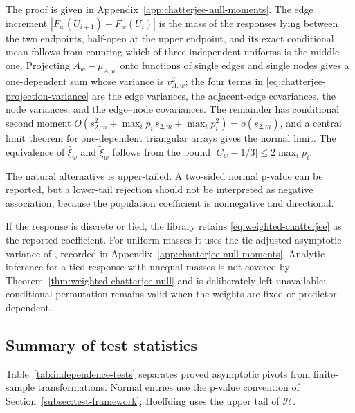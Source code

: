 The proof is given in Appendix~\ref{app:chatterjee-null-moments}. The edge
increment $|F_w(U_{i+1})-F_w(U_i)|$ is the mass of the responses lying
between the two endpoints, half-open at the upper endpoint, and its exact
conditional mean follows from counting which of three independent uniforms is
the middle one. Projecting $A_w-\mu_{A,w}$ onto functions of single edges and
single nodes gives a one-dependent sum whose variance is $v_{A,w}^2$; the four
terms in \eqref{eq:chatterjee-projection-variance} are the edge variances,
the adjacent-edge covariances, the node variances, and the edge--node
covariances. The remainder has conditional second moment
$O(s_{2,m}^2+\max_ip_i\,s_{2,m}+\max_ip_i^2)=o(s_{2,m})$, and a central limit
theorem for one-dependent triangular arrays \citep{janson2021} gives the
normal limit. The equivalence of $\widehat\xi_w$ and $\widetilde\xi_w$
follows from the bound $|C_w-1/3|\leq2\max_ip_i$.

The natural alternative is upper-tailed. A two-sided normal p-value can be
reported, but a lower-tail rejection should not be interpreted as negative
association, because the population coefficient is nonnegative and
directional.

If the response is discrete or tied, the library retains
\eqref{eq:weighted-chatterjee} as the reported coefficient. For uniform
masses it uses the tie-adjusted asymptotic variance of \citet{chatterjee2021},
recorded in Appendix~\ref{app:chatterjee-null-moments}. Analytic inference
for a tied response with unequal masses is not covered by
Theorem~\ref{thm:weighted-chatterjee-null} and is deliberately left
unavailable; conditional permutation remains valid when the weights are fixed
or predictor-dependent.

\subsection{Summary of test statistics}

Table~\ref{tab:independence-tests} separates proved asymptotic pivots from
finite-sample transformations. Normal entries use the p-value convention of
Section~\ref{subsec:test-framework}; Hoeffding uses the upper tail of
$\mathcal H$.

